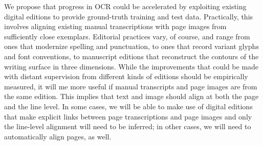 \documentclass[twoside,11pt]{report}
\begin{document}
We propose that progress in OCR could be accelerated by exploiting existing digital editions to provide ground-truth training and test data. Practically, this involves aligning existing manual transcriptions with page images from sufficiently close exemplars. Editorial practices vary, of course, and range from ones that modernize spelling and punctuation, to ones that record variant glyphs and font conventions, to manuscript editions that reconstruct the contours of the writing surface in three dimensions. While the improvements that could be made with distant supervision from different kinds of editions should be empirically measured, it will me more useful if manual transcripts and page images are from the same edition. This implies that text and image should align at both the page and the line level. In some cases, we will be able to make use of digital editions that make explicit links between page transcriptions and page images and only the line-level alignment will need to be inferred; in other cases, we will need to automatically align pages, as well.
\end{document}
